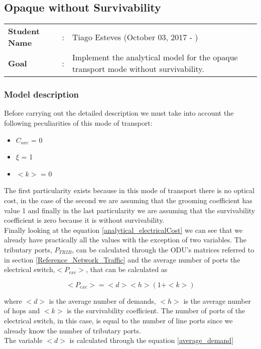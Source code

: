 \clearpage

\subsection{Opaque without Survivability}\label{analytical_Opaque_Survivability}
\begin{tcolorbox}	
\begin{tabular}{p{2.75cm} p{0.2cm} p{10.5cm}} 	
\textbf{Student Name}  &:& Tiago Esteves    (October 03, 2017 - )\\
\textbf{Goal}          &:& Implement the analytical model for the opaque transport mode without survivability.
\end{tabular}
\end{tcolorbox}

\subsubsection{Model description}

Before carrying out the detailed description we must take into account the following peculiarities of this mode of transport:
\begin{itemize}
  \item $C_{oxc}$ = 0
  \item $\xi$ = 1
  \item $<k>$ = 0
\end{itemize}

\vspace{11pt}
The first particularity exists because in this mode of transport there is no optical cost, in the case of the second we are assuming that the grooming coefficient has value 1 and finally in the last particularity we are assuming that the survivability coefficient is zero because it is without survivability.\\

Finally looking at the equation \ref{analytical_electricalCost} we can see that we already have practically all the values with the exception of two variables. The tributary ports, $P_{TRIB}$, can be calculated through the ODU's matrices referred to in section \ref{Reference_Network_Traffic} and the average number of ports the electrical switch,$<P_{exc}>$, that can be calculated as

\begin{equation}
<P_{exc}> = <d> <h> \left(1 + <k>\right)
\label{Pexc_opaque}
\end{equation}

\vspace{11pt}
\noindent
where $<d>$ is the average number of demands, $<h>$ is the average number of hops and $<k>$	is the survivability coefficient. The number of ports of the electrical switch, in this case, is equal to the number of line ports since we already know the number of tributary ports.\\
The variable $<d>$ is calculated through the equation \ref{average_demand}


